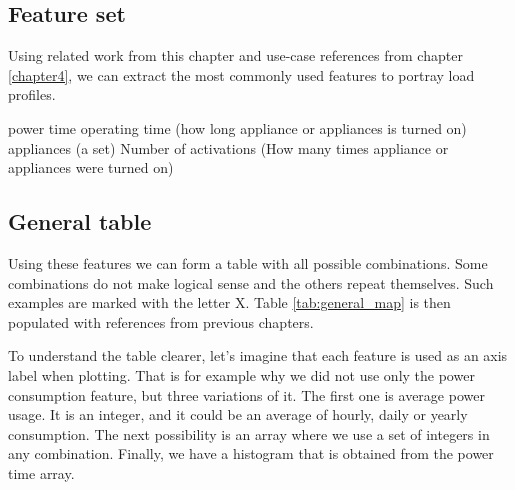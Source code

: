 \subsection{Feature set} \label{sec:feature_set}

Using related work from this chapter and use-case references from chapter \ref{chapter4},
we can extract the most commonly used features to portray load profiles.

\begin{outline}
    \1 power
    \1 time
    \1 operating time (how long appliance or appliances is turned on)
    \1 appliances (a set)
    \1 Number of activations (How many times appliance or appliances were turned on)
\end{outline}

\subsection{General table}
Using these features we can form a table with all possible combinations.
Some combinations do not make logical sense and the others repeat themselves.
Such examples are marked with the letter X.
Table \ref{tab:general_map} is then populated with references from previous chapters.

To understand the table clearer, let's imagine that each feature is used as an axis label when plotting. 
That is for example why we did not use only the power consumption feature, but three variations of it. 
The first one is average power usage. It is an integer, and it could be an average of hourly, daily or yearly consumption. 
The next possibility is an array where we use a set of integers in any combination.
Finally, we have a histogram that is obtained from the power time array. 

